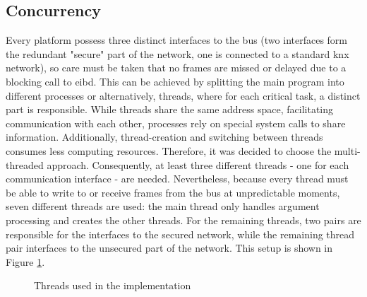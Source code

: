 \subsection{Concurrency}
Every platform possess three distinct interfaces to the bus (two interfaces form the redundant "secure" part of the network, one is connected
to a standard \gls{knx} network), so care must be taken that no frames are missed or delayed due to a blocking call to \gls{eibd}. This can be achieved by splitting the main program into different 
processes or alternatively, threads, where for each critical task, a distinct part is responsible. While threads share the same address space, facilitating communication with
each other, processes rely on special system calls 
to share information. Additionally, thread-creation and switching between threads consumes less computing resources. Therefore, it was decided to choose the multi-threaded
approach. Consequently, at least three different threads - one for each communication interface - are needed. Nevertheless, because every thread must be able to write to or receive
frames from the bus at unpredictable moments, seven different threads are used: the main thread only handles argument processing and creates the other threads. For the remaining threads,
two pairs are responsible for the interfaces to the secured network, while the remaining thread pair interfaces to the unsecured part of the network. This setup is shown in
Figure \ref{fig:Concthreads}.
\begin{figure}[h]
\centering
{}
\caption{Threads used in the implementation}
\label{fig:Concthreads}
\end{figure}
